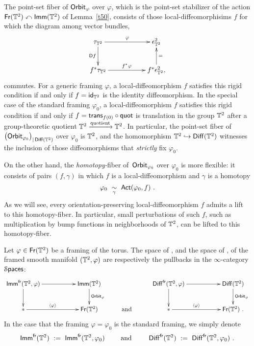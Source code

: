 \begin{remark}
\label{r5}
The point-set fiber of ${\sf Orbit}_{\varphi}$ over $\varphi$, which is the point-set stabilizer of the action $\operatorname{\sf Fr}(\mathbb T^2) \curvearrowleft \operatorname{\sf Imm}(\mathbb T^2)$ of Lemma~\ref{t50}, 
consists of those local-diffeomorphisims $f$ for which the diagram among vector bundles, 
\[
\xymatrix{
\tau_{\TT^2}
\ar[rr]^-{\varphi}
\ar[d]_-{\sD f}
&&
\epsilon^2_{\TT^2}
\\
f^\ast 
\tau_{\TT^2}
\ar[rr]^-{f^\ast \varphi}
&&
f^\ast
\epsilon^2_{\TT^2}
\ar[u]_-=
,
}
\]
commutes.
For a generic framing $\varphi$, a local-diffeomorphism $f$ satisfies this rigid condition if and only if $f = \operatorname{\sf id}_{\mathbb T^2}$ is the identity diffeomorphism.
In the special case of the standard framing $\varphi_0$, a local-diffeomorphism $f$ satisfies this rigid condition if and only if $f = {\sf trans}_{f(0)} \circ {\sf quot}$ is translation in the group $\mathbb T^2$ after a group-theoretic quotient $\mathbb T^2 \xrightarrow{\rm quotient} \mathbb T^2$. 
In particular, the point-set fiber of $\bigl( {\sf Orbit}_{\varphi_0} \bigr)_{|\operatorname{{\sf Diff}}(\mathbb T^2)}$ over $\varphi_0$ is $\mathbb T^2$, and the homomorphism $\mathbb T^2 \hookrightarrow \operatorname{{\sf Diff}}(\mathbb T^2)$ witnesses the inclusion of those diffeomorphisms that \emph{strictly} fix $\varphi_0$.  


On the other hand, the \emph{homotopy-}fiber of~${\sf Orbit}_{\varphi_0}$ over $\varphi_0$ is more flexible: 
it consists of pairs $(f, \gamma)$ in which $f$ is a local-diffeomorphism and $\gamma$ is a homotopy 
\[
\varphi_0
~ \underset{\gamma}\sim ~
\operatorname{\sf Act}(\varphi_0,f)
~.
\]
As we will see, every orientation-preserving local-diffeomorphism $f$ admits a lift to this homotopy-fiber.  
In particular, small perturbations of such $f$, such as multiplication by bump functions in neighborhoods of $\mathbb T^2$, can be lifted to this homotopy-fiber.
\end{remark}




\begin{definition}\label{d1}
Let $\varphi\in \operatorname{\sf Fr}(\mathbb T^2)$ be a framing of the torus.  
The space of , and the space of , of the framed smooth manifold $(\mathbb T^2,\varphi)$ are respectively the pullbacks in the $\infty$-category $\operatorname{\mathcal S\mathsf{paces}}$:
\begin{equation*}
\xymatrix{
\Imm^{\sf fr}(\TT^2,\varphi)
\ar[rr]
\ar[d]
&&
\Imm(\TT^2)
\ar[d]^-{{\sf Orbit}_\varphi}
&&
\Diff^{\sf fr}(\TT^2,\varphi)
\ar[rr]
\ar[d]
&&
\Diff(\TT^2)
\ar[d]^-{{\sf Orbit}_\varphi}
\\
\ast
\ar[rr]^-{\lag \varphi \rag}
&&
\Fr(\TT^2)
&
\text{ and }
&
\ast
\ar[rr]^-{\lag \varphi \rag}
&&
\Fr(\TT^2)
~.
}
\end{equation*}
In the case that the framing $\varphi = \varphi_0$ is the standard framing, we simply denote
\[
\operatorname{\sf Imm}^{\sf fr}(\mathbb T^2)
~:=~
\operatorname{\sf Imm}^{\sf fr}(\mathbb T^2,\varphi_0)
\qquad
\text{ and }
\qquad
\operatorname{{\sf Diff}}^{\sf fr}(\mathbb T^2)
~:=~
\operatorname{{\sf Diff}}^{\sf fr}(\mathbb T^2,\varphi_0)
~.
\]
\end{definition}





